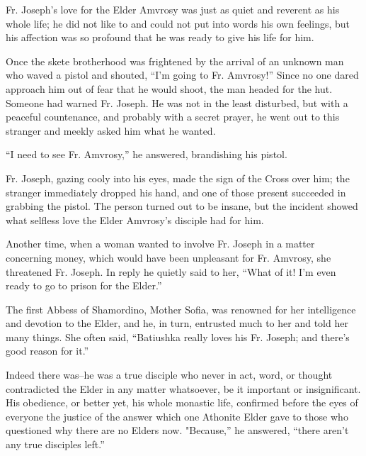 Fr. Joseph's love for the Elder Amvrosy was just as quiet and reverent as his whole life; he did not like to and could not put into words his own feelings, but his affection was so profound that he was ready to give his life for him.

Once the skete brotherhood was frightened by the arrival of an unknown man who waved a pistol and shouted, “I'm going to Fr. Amvrosy!” Since no one dared approach him out of fear that he would shoot, the man headed for the hut. Someone had warned Fr. Joseph. He was not in the least disturbed, but with a peaceful countenance, and probably with a secret prayer, he went out to this stranger and meekly asked him what he wanted.

“I need to see Fr. Amvrosy,” he answered, brandishing his pistol.

Fr. Joseph, gazing cooly into his eyes, made the sign of the Cross over him; the stranger immediately dropped his hand, and one of those present succeeded in grabbing the pistol. The person turned out to be insane, but the incident showed what selfless love the Elder Amvrosy's disciple had for him.

Another time, when a woman wanted to involve Fr. Joseph in a matter concerning money, which would have been unpleasant for Fr. Amvrosy, she threatened Fr. Joseph. In reply he quietly said to her, “What of it! I'm even ready to go to prison for the Elder.”

The first Abbess of Shamordino, Mother Sofia, was renowned for her intelligence and devotion to the Elder, and he, in turn, entrusted much to her and told her many things. She often said, “Batiushka really loves his Fr. Joseph; and there's good reason for it.”

Indeed there was--he was a true disciple who never in act, word, or thought contradicted the Elder in any matter whatsoever, be it important or insignificant. His obedience, or better yet, his whole monastic life, confirmed before the eyes of everyone the justice of the answer which one Athonite Elder gave to those who questioned why there are no Elders now. "Because,” he answered, “there aren't any true disciples left.”

